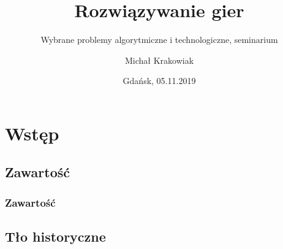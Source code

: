 \documentclass[polish,envcountsect,10pt]{beamer}
\title{Rozwiązywanie gier}
\author{Michał Krakowiak}
\subtitle{Wybrane problemy algorytmiczne i technologiczne, seminarium}
\date{Gdańsk, 05.11.2019}
\begin{document}
    \frame{\titlepage}
    \section{Wstęp}
        \subsection{Zawartość}
            \begin{frame}
                \frametitle{Zawartość}
                \begin{multicols}{2}
                    \tableofcontents[pausesections]                    
                \end{multicols}
            \end{frame}
        \subsection{Tło historyczne}
\end{document}
